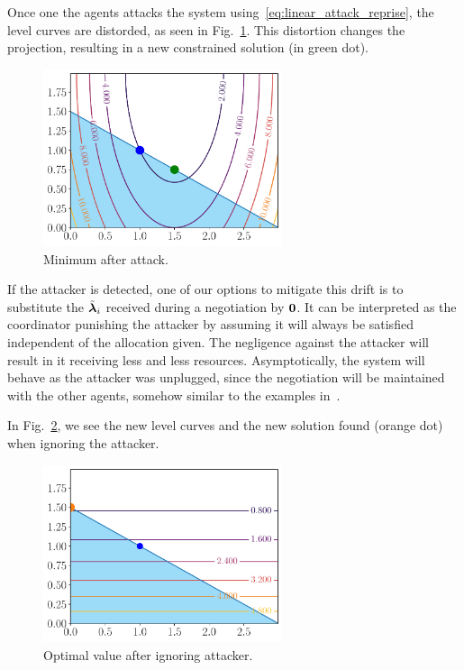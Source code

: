 \documentclass[../main.tex]{subfiles}
\begin{document}
Once one the agents attacks the system using~\eqref{eq:linear_attack_reprise}, the level curves are distorded, as seen in Fig.~\ref{fig:minimum_after_attack}.
This distortion changes the projection, resulting in a new constrained solution (in green dot).
\begin{figure}[h]
  \centering
  \includegraphics[width=7cm]{../img/resilient_eq/new-minimum-selfish.pdf}
  \caption{Minimum after attack.}\label{fig:minimum_after_attack}
\end{figure}

If the attacker is detected, one of our options to mitigate this drift is to substitute the $\tilde{\boldsymbol{\lambda}}_{i}$ received during a negotiation by $\mathbf{0}$.
It can be interpreted as the coordinator punishing the attacker by assuming it will always be satisfied independent of the allocation given.
The negligence against the attacker will result in it receiving less and less resources. Asymptotically, the system will behave as the attacker was unplugged, since the negotiation will be maintained with the other agents, somehow similar to the examples in~\cite{VelardeEtAl2018,MaestreEtAl2021}.

In Fig.~\ref{fig:minimum_ignoring_attacker}, we see the new level curves and the new solution found (orange dot) when ignoring the attacker.
\begin{figure}[h]
  \centering
  \includegraphics[width=7cm]{../img/resilient_eq/ignoreX.pdf}
  \caption{Optimal value after ignoring attacker.}\label{fig:minimum_ignoring_attacker}
\end{figure}
\end{document}
